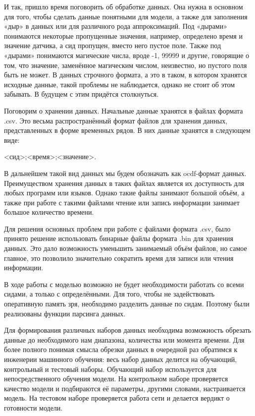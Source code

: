 {\gostFont

  \par \redline И так, пришло время поговорить об обработке данных. Она нужна в основном для того, чтобы сделать данные понятными для модели, а также для заполнения «дыр» в данных или для различного рода аппроксимаций. Под «дырами» понимаются некоторые пропущенные значения, например, определено время и значение датчика, а сид пропущен, вместо него пустое поле. Также под «дырами» понимаются магические числа, вроде -1, 99999 и другие, говорящие о том, что значение, заменённое магическим числом, неизвестно, но пустого поля быть не может. В данных строчного формата, а это в таком, в котором хранятся исходные данные, такой проблемы не наблюдается, однако не стоит об этом забывать. В будущем с этим придётся столкнуться.

  \par \redline Поговорим о хранении данных. Начальные данные хранятся в файлах формата .csv. Это весьма распространённый формат файлов для хранения данных, представленных в форме временных рядов. В них данные хранятся в следующем виде: 

  \formulaspace
  \begin{Center}
  <сид>;<время>;<значение>. 
  \end{Center}
  \formulaspace

  \par \redline В дальнейшем такой вид данных мы будем обозначать как ocdf-формат данных. Преимуществом хранения данных в таких файлах является их доступность для любых программ или языков. Однако такие файлы занимают большой объём, а также при работе с такими файлами чтение или запись информации занимает большое количество времени.  

  \par \redline Для решения основных проблем при работе с файлами формата .csv, было принято решение использовать бинарные файлы формата .bin для хранения данных. Это дало возможность уменьшить занимаемый объём файлов, но самое главное, это позволило значительно сократить время для записи или чтения информации. 

  \par \redline В ходе работы с моделью возможно не будет необходимости работать со всеми сидами, а только с определёнными. Для того, чтобы не задействовать оперативную память зря, необходимо разделить данные по сидам. Поэтому были реализованы функции парсинга данных.

  \par \redline Для формирования различных наборов данных необходима возможность обрезать данные до необходимого нам диапазона, количества или момента времени. Для более полного понимая смысла обрезки данных в очередной раз обратимся к инженерии машинного обучения: весь набор данных делится на обучающий, контрольный и тестовый наборы. Обучающий набор используется для непосредственного обучения модели. На контрольном наборе проверяется качество модели и подбираются её параметры, другими словами, настраивается модель. На тестовом наборе проверяется работа сети и делается вердикт о готовности модели. 

}
